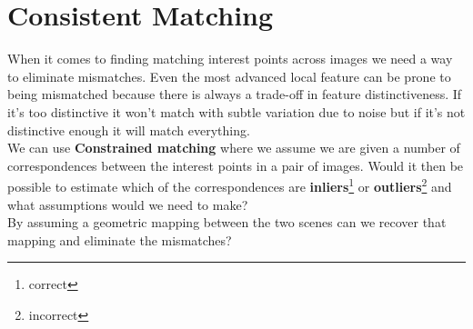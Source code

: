 \documentclass{article}
\begin{document}
	\section{Consistent Matching}
	When it comes to finding matching interest points across images we need a way to eliminate mismatches. Even the most advanced local feature can be prone to being mismatched because there is always a trade-off in feature distinctiveness. If it's too distinctive it won't match with subtle variation due to noise but if it's not distinctive enough it will match everything.\\
	We can use \textbf{Constrained matching} where we assume we are given a number of correspondences between the interest points in a pair of images. Would it then be possible to estimate which of the correspondences are \textbf{inliers}\footnote{correct} or \textbf{outliers}\footnote{incorrect} and what assumptions would we need to make?\\
	By assuming a geometric mapping between the two scenes can we recover that mapping and eliminate the mismatches?
\end{document}
